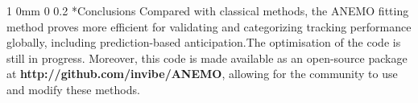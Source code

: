 \documentclass[profile,final,english, draft]{sciposter}%
\makeatletter
\renewcommand{\section}{\@startsection
        {section}%
        {1}%
        {0mm}%
        {0\baselineskip}%
        {0.2\baselineskip}%
        {\LARGE\color{red}\bfseries}}%
\makeatother
\begin{document}
\vspace{.1\baselineskip}

\section*{Conclusions}
\vspace{-.8\baselineskip}
Compared with classical methods, the ANEMO fitting method proves more efficient for validating and categorizing tracking performance globally, including prediction-based anticipation.The optimisation of the code is still in progress. Moreover, this code is made available as an open-source package at \textbf{http://github.com/invibe/ANEMO}, allowing for the community to use and modify these methods.
{\tiny
\printbibliography
}


\end{document}
